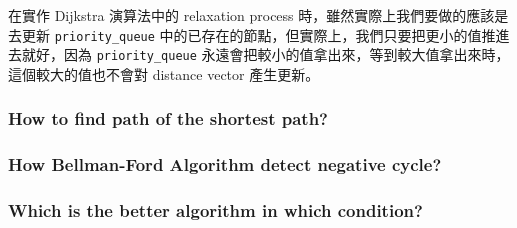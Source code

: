 \documentclass{article}[12pt]
\begin{document}
在實作 Dijkstra 演算法中的 relaxation process 時，雖然實際上我們要做的應該是去更新 \texttt{priority\_queue} 中的已存在的節點，但實際上，我們只要把更小的值推進去就好，因為 \texttt{priority\_queue} 永遠會把較小的值拿出來，等到較大值拿出來時，這個較大的值也不會對 distance vector 產生更新。

\subsubsection{How to find path of the shortest path?}

\subsubsection{How Bellman-Ford Algorithm detect negative cycle?}

\subsubsection{Which is the better algorithm in which condition?}
\end{document}
